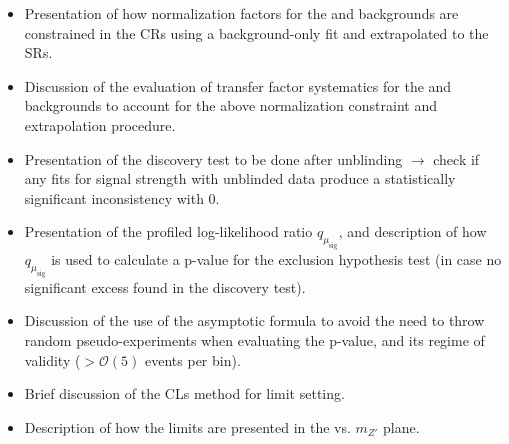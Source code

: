 \begin{itemize}
\item Presentation of how normalization factors for the \wjets and \ttbar backgrounds are constrained in the CRs using a background-only fit and extrapolated to the SRs. 
\item Discussion of the evaluation of transfer factor systematics for the \wjets and \ttbar backgrounds to account for the above normalization constraint and extrapolation procedure.
\item Presentation of the discovery test to be done after unblinding $\rightarrow$ check if any fits for signal strength with unblinded data produce a statistically significant inconsistency with 0.
\item Presentation of the profiled log-likelihood ratio $q_{\mu_\text{sig}}$, and description of how $q_{\mu_\text{sig}}$ is used to calculate a p-value for the exclusion hypothesis test (in case no significant excess found in the discovery test).
\item Discussion of the use of the asymptotic formula to avoid the need to throw random pseudo-experiments when evaluating the p-value, and its regime of validity ($>\mathcal{O}(5)$ events per bin).
\item Brief discussion of the CLs method for limit setting.
\item Description of how the limits are presented in the \ms vs. $m_{Z'}$ plane.
\end{itemize}
